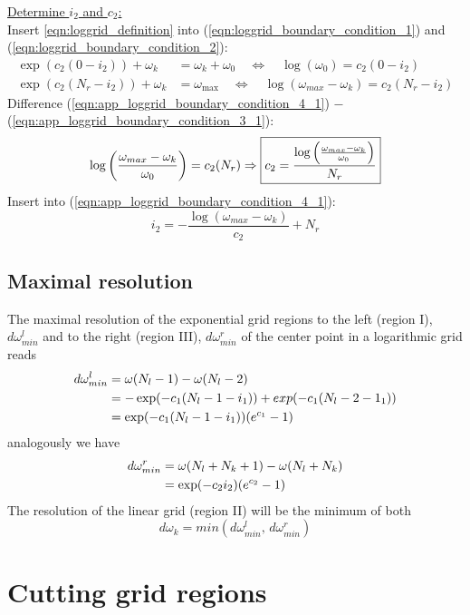 \newpage
\vspace{1cm}
\noindent\underline{Determine $i_2$ and $c_2$:}\\

\noindent Insert \ref{eqn:loggrid_definition} into (\ref{eqn:loggrid_boundary_condition_1}) and (\ref{eqn:loggrid_boundary_condition_2}):
\begin{align}
	\exp(c_2(0-i_2))+\omega_k&=\omega_k+\omega_0 \quad \Leftrightarrow \quad \log(\omega_0)=c_2 (0-i_2) \label{eqn:app_loggrid_boundary_condition_3_1}\\
	\exp(c_2(N_r-i_2))+\omega_k&=\omega_{\max} \quad \Leftrightarrow \quad \log(\omega_{max}-\omega_k)=c_2(N_r-i_2) \label{eqn:app_loggrid_boundary_condition_4_1}
\end{align}
Difference (\ref{eqn:app_loggrid_boundary_condition_4_1}) $-$ (\ref{eqn:app_loggrid_boundary_condition_3_1}):
\[
	\log\left(\frac{\omega_{max}-\omega_k}{\omega_0}\right)=c_2 (N_r)\\\Rightarrow \boxed{c_2=\frac{\log\left(\frac{\omega_{max}-\omega_k}{\omega_0}\right)}{N_r}}
\]
Insert into (\ref{eqn:app_loggrid_boundary_condition_4_1}):
\[
	\boxed{i_2=-\frac{\log(\omega_{max}-\omega_k)}{c_2} + N_r}
\]
\section{Maximal resolution}
\label{sec:app_loggrid_max_resolution}
The maximal resolution of the exponential grid regions to the left (region I), $d\omega_{min}^{l}$ and to the right (region III), $d\omega_{min}^{r}$ of the center point in a logarithmic grid reads
\begin{align*}
	d\omega_{min}^{l} & = \omega(N_l-1)-\omega(N_l-2) \notag \\
	& = -\exp(-c_1(N_l-1-i_1))+exp(-c_1(N_l-2-1_1)) \notag \\
	& = \exp(-c_1(N_l-1-i_1))(e^{c_1}-1)
\end{align*}
analogously we have
\begin{align*}
	d\omega_{min}^{r} & = \omega(N_l+N_k+1)-\omega(N_l+N_k) \notag \\
	& = \exp(-c_2 i_2)(e^{c_2}-1)
\end{align*}
The resolution of the linear grid (region II) will be the minimum of both
\[
	d\omega_k = min( d\omega_{min}^{l} ,\,d\omega_{min}^{r})
\]
\chapter{Cutting grid regions}\label{chapter:app_cutting}
